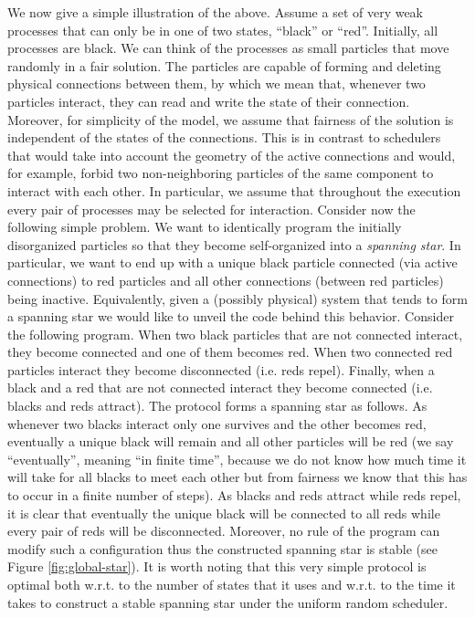 \documentclass[oribibl, 11pt]{llncs}
\begin{document}
We now give a simple illustration of the above. Assume a set of  very weak processes that can only be in one of two states, ``black'' or ``red''. Initially, all processes are black. We can think of the processes as small particles that move randomly in a fair solution. The particles are capable of forming and deleting physical connections between them, by which we mean that, whenever two particles interact, they can read and write the state of their connection. Moreover, for simplicity of the model, we assume that fairness of the solution is independent of the states of the connections. This is in contrast to schedulers that would take into account the geometry of the active connections and would, for example, forbid two non-neighboring particles of the same component to interact with each other. In particular, we assume that throughout the execution every pair of processes may be selected for interaction. Consider now the following simple problem. We want to identically program the initially disorganized particles so that they become self-organized into a \emph{spanning star}. In particular, we want to end up with a unique black particle  connected (via active connections) to  red particles and all other connections (between red particles) being inactive. Equivalently, given a (possibly physical) system that tends to form a spanning star we would like to unveil the code behind this behavior. Consider the following program. When two black particles that are not connected interact, they become connected and one of them becomes red. When two connected red particles interact they become disconnected (i.e. reds repel). Finally, when a black and a red that are not connected interact they become connected (i.e. blacks and reds attract). The protocol forms a spanning star as follows. As whenever two blacks interact only one survives and the other becomes red, eventually a unique black will remain and all other particles will be red (we say ``eventually'', meaning ``in finite time'', because we do not know how much time it will take for all blacks to meet each other but from fairness we know that this has to occur in a finite number of steps). As blacks and reds attract while reds repel, it is clear that eventually the unique black will be connected to all reds while every pair of reds will be disconnected. Moreover, no rule of the program can modify such a configuration thus the constructed spanning star is stable (see Figure \ref{fig:global-star}). It is worth noting that this very simple protocol is optimal both w.r.t. to the number of states that it uses and w.r.t. to the time it takes to construct a stable spanning star under the uniform random scheduler.
\end{document}
